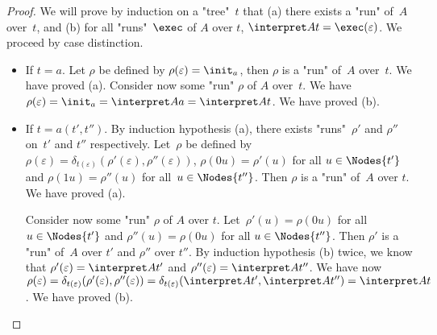 \documentclass{article}
\begin{document}
\begin{proof}
	We will prove by induction on a "tree"~$t$ that (a) there exists a "run" of~$A$ over~$t$, and (b) for all "runs"~$\exec$ of $A$ over $t$, $\interpret A t = \exec (\varepsilon)$.
	We proceed by case distinction.
	\begin{itemize}
		\item If $t = a$. Let $\rho$ be defined by $\rho(\varepsilon)=\init_a$, then $\rho$ is a "run" of~$A$ over~$t$. We have proved (a).
		      Consider now some "run" $\rho$ of $A$ over~$t$. We have $\rho(\varepsilon)=\init_a=\interpret A a=\interpret A t$. We have proved  (b).

		\item If $t = a(t',t'')$. By induction hypothesis (a), there exists "runs"~$\rho'$ and $\rho''$ on~$t'$ and $t''$ respectively.
		      Let~$\rho$ be defined by $\rho(\varepsilon)=\delta_{t(\varepsilon)}(\rho'(\varepsilon),\rho''(\varepsilon))$,
		      $\rho(0u)=\rho'(u)$ for all $u\in\Nodes{t'}$ and $\rho(1u)=\rho''(u)$ for all~$u\in \Nodes{t''}$. Then $\rho$ is a "run" of~$A$ over $t$. We have proved (a).

		      Consider now some "run" $\rho$ of $A$ over $t$. Let~$\rho'(u)=\rho(0u)$ for all $u \in \Nodes {t'}$ and $\rho''(u)=\rho(0u)$ for all $u \in \Nodes {t''}$.
		      Then $\rho'$ is a "run" of~$A$ over $t'$ and $\rho''$ over $t''$. By induction hypothesis (b) twice, we know that $\rho'(\varepsilon)=\interpret A {t'}$ and $\rho''(\varepsilon)=\interpret A {t''}$.
		      We have now $\rho(\varepsilon) = \delta_{t(\varepsilon)}(\rho'(\varepsilon),\rho''(\varepsilon)) = \delta_{t(\varepsilon)}(\interpret A {t'},\interpret A {t''}) = \interpret A t$. We have proved (b).
	\end{itemize}
\end{proof}
\end{document}
